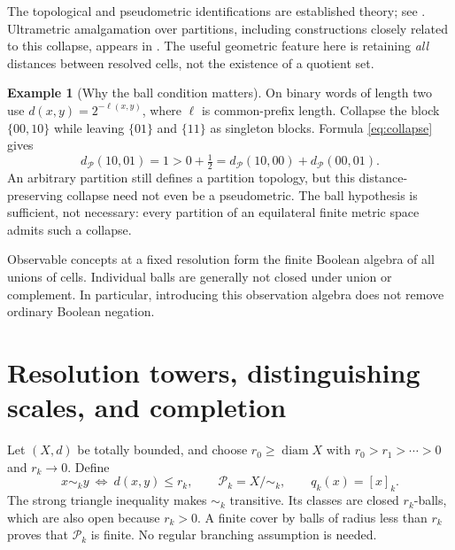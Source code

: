 \documentclass[11pt]{article}
\theoremstyle{definition}
\newtheorem{example}[theorem]{Example}
\theoremstyle{remark}
\newcommand{\diam}{\operatorname{diam}}
\newcommand{\PP}{\mathcal P}
\begin{document}
The topological and pseudometric identifications are established theory; see \cite[Theorem 5.3]{Pirttimaki2019}. Ultrametric amalgamation over partitions, including constructions closely related to this collapse, appears in \cite[Propositions 2.31--2.32]{Ishiki2023}. The useful geometric feature here is retaining \emph{all} distances between resolved cells, not the existence of a quotient set.

\begin{example}[Why the ball condition matters]\label{ex:arbitrary}
On binary words of length two use $d(x,y)=2^{-\ell(x,y)}$, where $\ell$ is common-prefix length. Collapse the block $\{00,10\}$ while leaving $\{01\}$ and $\{11\}$ as singleton blocks. Formula \eqref{eq:collapse} gives
\[
 d_{\PP}(10,01)=1>0+\tfrac12
 =d_{\PP}(10,00)+d_{\PP}(00,01).
\]
An arbitrary partition still defines a partition topology, but this distance-preserving collapse need not even be a pseudometric. The ball hypothesis is sufficient, not necessary: every partition of an equilateral finite metric space admits such a collapse.
\end{example}

Observable concepts at a fixed resolution form the finite Boolean algebra of all unions of cells. Individual balls are generally not closed under union or complement. In particular, introducing this observation algebra does not remove ordinary Boolean negation.

\section{Resolution towers, distinguishing scales, and completion}\label{sec:tower}
Let $(X,d)$ be totally bounded, and choose $r_0\geq\diam X$ with
$r_0>r_1>\cdots>0$ and $r_k\to0$. Define
\[
 x\sim_k y\ \Longleftrightarrow\ d(x,y)\leq r_k,
 \qquad \PP_k=X/{\sim_k},\qquad q_k(x)=[x]_k.
\]
The strong triangle inequality makes $\sim_k$ transitive. Its classes are closed $r_k$-balls, which are also open because $r_k>0$. A finite cover by balls of radius less than $r_k$ proves that $\PP_k$ is finite. No regular branching assumption is needed.
\end{document}
